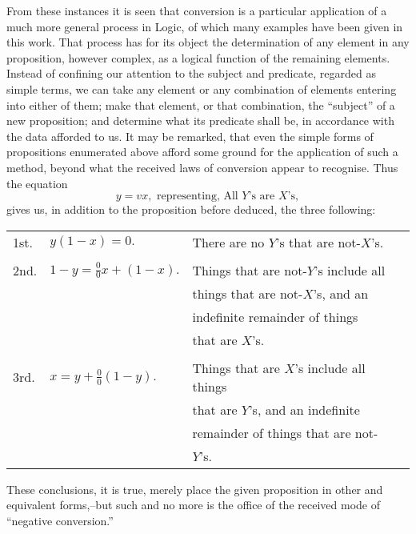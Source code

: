 \documentclass[oneside]{book}
\begin{document}
From these instances it is seen that conversion is a particular
application of a much more general process in Logic, of which
many examples have been given in this work. That process has
for its object the determination of any element in any proposition,
however complex, as a logical function of the remaining elements.
Instead of confining our attention to the subject and predicate,
regarded as simple terms, we can take any element or any
combination of elements entering into either of them; make that
element, or that combination, the ``subject'' of a new proposition;
and determine what its predicate shall be, in accordance with the
data afforded to us. It may be remarked, that even the simple
forms of propositions enumerated above afford some ground for
the application of such a method, beyond what the received laws
of conversion appear to recognise. Thus the equation
\begin{equation*}
y=vx,\text{ representing, All }Y\text{'s are }X\text{'s},
\end{equation*}
gives us, in addition to the proposition before deduced, the three
following:
\begin{center}
\begin{tabular}[h!]{lll}
1st. & $y(1-x)=0.$ & There are no $Y$'s that are not-$X$'s.\\ \\
2nd. & $\displaystyle 1-y=\frac{0}{0}x+(1-x).$ & Things that are not-$Y$'s include all\\
 & & \hspace{0.35in}things that are not-$X$'s, and an \\
 & & \hspace{0.35in}indefinite remainder of things \\
 & & \hspace{0.35in}that are $X$'s. \\ \\
3rd. & $\displaystyle x=y+\frac{0}{0}(1-y).$ & Things that are $X$'s include all things \\
 & & \hspace{0.35in}that are $Y$'s, and an indefinite \\
 & & \hspace{0.35in}remainder of things that are not-\\
 & & \hspace{0.35in}$Y$'s.
\end{tabular}
\end{center}

These conclusions, it is true, merely place the given proposition
in other and equivalent forms,--but such and no more is
the office of the received mode of ``negative conversion.''
\end{document}
